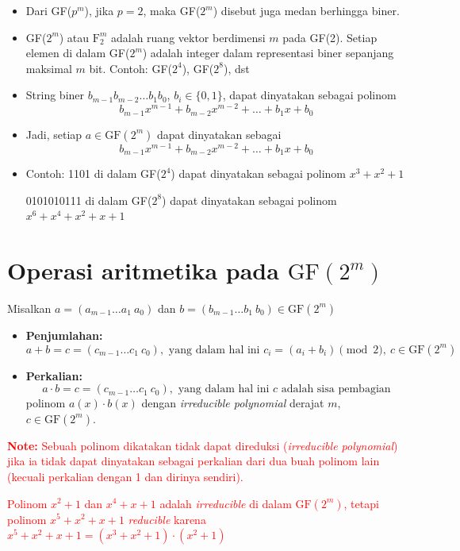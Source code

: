 \documentclass{article}
\begin{document}
\begin{itemize}
    \item Dari GF($p^m$), jika $p = 2$, maka GF($2^m$) disebut juga medan berhingga biner.
    \item GF($2^m$) atau $\text{F}_2^m$ adalah ruang vektor berdimensi $m$ pada GF(2). Setiap elemen di dalam GF($2^m$) adalah integer dalam representasi biner sepanjang maksimal $m$ bit.
    Contoh: GF($2^4$), GF($2^8$), dst
    \item String biner $b_{m-1}b_{m-2} \dots b_1b_0$, $b_i \in \{0,1\}$, dapat dinyatakan sebagai polinom
    \[ b_{m-1}x^{m-1} + b_{m-2}x^{m-2} + \dots + b_1x + b_0 \]
    \item Jadi, setiap $a \in \text{GF}(2^m)$ dapat dinyatakan sebagai
    \[ b_{m-1}x^{m-1} + b_{m-2}x^{m-2} + \dots + b_1x + b_0 \]
    \item Contoh: 1101 di dalam GF($2^4$) dapat dinyatakan sebagai polinom $x^3 + x^2 + 1$
    
    0101010111 di dalam GF($2^8$) dapat dinyatakan sebagai polinom $x^6 + x^4 + x^2 + x + 1$
\end{itemize}

\newpage


\section*{Operasi aritmetika pada $\text{GF}(2^m)$}

Misalkan $a = (a_{m-1} \dots a_1 \ a_0)$ dan $b = (b_{m-1} \dots b_1 \ b_0) \in \text{GF}(2^m)$

\begin{itemize}
    \item \textbf{Penjumlahan:}
    \[ a + b = c = (c_{m-1} \dots c_1 \ c_0), \text{ yang dalam hal ini } c_i = (a_i + b_i) \pmod{2}, \ c \in \text{GF}(2^m) \]

    \item \textbf{Perkalian:}
    \[ a \cdot b = c = (c_{m-1} \dots c_1 \ c_0), \text{ yang dalam hal ini } c \text{ adalah sisa pembagian} \]
    polinom $a(x) \cdot b(x)$ dengan \textit{irreducible polynomial} derajat $m$, $c \in \text{GF}(2^m)$.
\end{itemize}

\textcolor{red}{\textbf{Note:} Sebuah polinom dikatakan tidak dapat direduksi (\textit{irreducible polynomial}) jika ia tidak dapat dinyatakan sebagai perkalian dari dua buah polinom lain (kecuali perkalian dengan 1 dan dirinya sendiri).

Polinom $x^2 + 1$ dan $x^4 + x + 1$ adalah \textit{irreducible} di dalam $\text{GF}(2^m)$, tetapi polinom $x^5 + x^2 + x + 1$ \textit{reducible} karena $x^5 + x^2 + x + 1 = (x^3 + x^2 + 1) \cdot (x^2 + 1)$}
\end{document}
